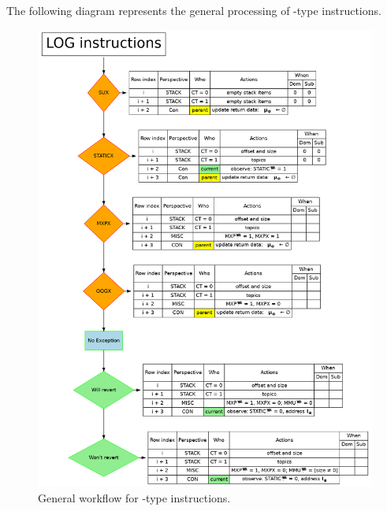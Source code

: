 The following diagram represents the general processing of -type instructions.

\begin{figure}[!h]
\centering
\includegraphics[width=\textwidth]{instruction_handling/logs/flowcharts/logs.png}
	\caption{General workflow for -type instructions.}
\label{hub: call: fig: general processing}
\end{figure}

